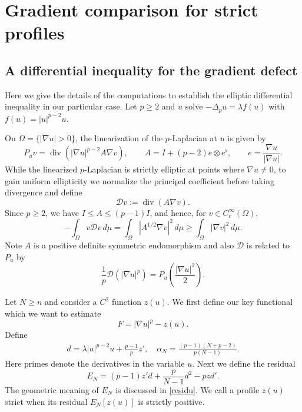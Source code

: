 \documentclass[11pt]{amsart}
\theoremstyle{definition}
\begin{document}
\section{Gradient comparison for strict profiles}
\subsection{A differential inequality for the gradient defect}
Here we give the details of the computations to establish the elliptic differential inequality in our particular case.  Let $p\geq 2$ and $u$ solve $-\Delta_pu=\lambda f(u)$ with $f(u)=|u|^{p-2}u$.  

On \(\Omega=\{|\nabla u|>0\}\), the linearization of the \(p\)-Laplacian at \(u\) is given by
\begin{equation}\label{linearized}
P_uv=\operatorname{div}\!\left(|\nabla u|^{p-2}A\nabla v\right),
\qquad
A=I+(p-2)e\otimes e^\flat,
\qquad
e=\frac{\nabla u}{|\nabla u|}.
\end{equation}
While the linearized $p$-Laplacian is strictly elliptic at points where $\nabla u \neq 0$, to gain uniform ellipticity we normalize the principal coefficient before taking divergence and define
\begin{equation}\label{Dop}
\mathcal Dv:=\operatorname{div}(A\nabla v).
\end{equation}
Since \(p\ge2\), we have \(I\le A\le(p-1)I\), and hence, for \(v\in C^\infty_c(\Omega)\),
\[
-\int_\Omega v\mathcal Dv\,d\mu
=\int_\Omega|A^{1/2}\nabla v|^2\,d\mu
\ge\int_\Omega|\nabla v|^2\,d\mu.
\]
Note $A$ is a positive definite symmetric endomorphism and also $\mathcal{D}$ is related to $P_u$ by
\[
\frac1p\mathcal D(|\nabla u|^p)
=P_u\!\left(\frac{|\nabla u|^2}{2}\right).
\]



Let $N\geq n$ and consider a $C^2$ function $z(u)$.  We first define our key functional which we want to estimate
\begin{equation}
    F=|\nabla u|^p-z(u).
\end{equation}
Define
\begin{align*}
    d=\lambda |u|^{p-2}u+\frac{p-1}{p}z', \quad 
    \alpha_N=\frac{(p-1)(N+p-2)}{p(N-1)}.
\end{align*}
Here primes denote the derivatives in the variable $u$. 
Next we define the residual
\begin{equation}\label{residual}
     E_N=(p-1)z'd+\frac{p}{N-1}d^2-pzd'.
\end{equation}
The geometric meaning of $E_N$ is discussed in \ref{residu}. We call a profile $z(u)$ strict when its residual $E_N[z(u)]$ is strictly positive.
\end{document}
